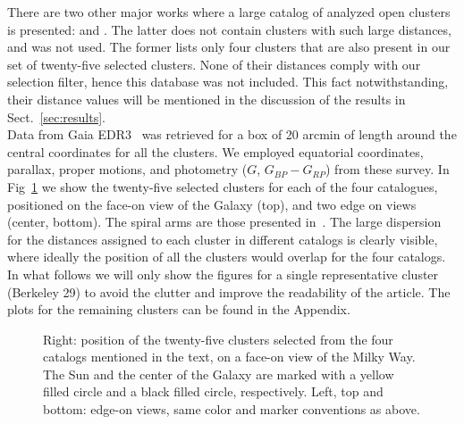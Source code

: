 \documentclass[draft]{aa}
\begin{document}
 There are two other major works where a large catalog of analyzed open clusters
 is presented: \cite{Lui_2019} and \cite{Dias_2021}. The latter does not contain
 clusters with such large distances, and was not used. The former lists
 only four clusters that are also present in our set of twenty-five selected
 clusters. None of their distances comply with our selection filter, hence this
 database was not included. This fact notwithstanding, their distance values will
 be mentioned in the discussion of the results in Sect.~\ref{sec:results}.\\

 Data from Gaia EDR3~\citep{Gaia_2016,Gaia_EDR3} was retrieved for a box of 20
 arcmin of length around the central coordinates for all the clusters. We
 employed equatorial coordinates, parallax, proper motions, and photometry
 ($G$, $G_{BP}-G_{RP}$) from these survey.
 In Fig~\ref{fig:MWmap} we show the twenty-five selected clusters for each of
 the four catalogues, positioned on the face-on view of the Galaxy (top), and
 two edge on views (center, bottom). The spiral arms are those presented
 in~\cite{Momany_2006}. The large dispersion for the distances
 assigned to each cluster in different catalogs is clearly visible, where
 ideally the position of all the clusters would overlap for the four catalogs.\\

 In what follows we will only show the figures for a single representative
 cluster (Berkeley 29) to avoid the clutter and improve the readability of the
 article. The plots for the remaining clusters can be found in the Appendix.

 \begin{figure}
  \caption{Right: position of the twenty-five clusters selected from the four
  catalogs mentioned in the text, on a face-on view of the Milky Way. The Sun
  and the center of the Galaxy are marked with a yellow filled circle and a
  black filled circle, respectively. Left, top and bottom: edge-on views,
  same color and marker conventions as above.}
  \label{fig:MWmap}
 \end{figure}
\end{document}
